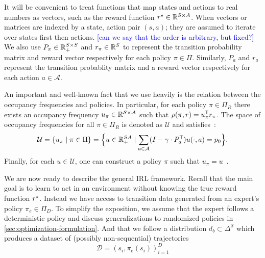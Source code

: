 \documentclass[10pt]{article}
\renewcommand{\cite}{\citep}
\newcommand{\mm}[1]{\textcolor{blue}{[#1]}}
\begin{document}
It will be convenient to treat functions that map states and actions to real numbers as vectors, such as the reward function $r^{\mathnormal{\star}} \in \mathbb{R}^{S \times  A}$. When vectors or matrices are indexed by a state, action pair $(s,a)$; they are assumed to iterate over states first then actions. \mm{can we say that the order is arbitrary, but fixed?} We also use $P_{\pi} \in \mathbb{R}_+^{S \times S}$ and $r_{\pi}\in \mathbb{R}^S$  to represent the transition probability matrix and reward vector respectively for each policy $\pi\in \Pi$. Similarly, $P_a$ and $r_a$ represent the transition probablity matrix and a reward vector respectively for each action $a\in \mathcal{A}$.

An important and well-known fact that we use heavily is the relation between the occupancy frequencies and policies. In particular, for each policy $\pi\in\Pi_R$ there exists an occupancy frequency $u_{\pi}\in \mathbb{R}^{\mathcal{S}\times \mathcal{A}}$ such that $\rho(\pi, r) = u_{\pi}^{\mathsf{T}} r_{\pi}$. The space of occupancy frequencies for all $\pi\in \Pi_R$
is denoted as $\mathcal{U}$ and satisfies~\cite[Section~6.9]{Puterman1994}:
\[
  \mathcal{U}
  =
\left\{ u_{\pi} \mid  \pi \in \Pi \right\}
  = \Bigl\{ u\in \mathbb{R}^{SA}_{+} \mid \sum_{a\in \mathcal{A}} (I - \gamma\cdot P^{\mathsf{T}}_a) u(\cdot, a) = p_0 \Bigr\}.
\]
Finally, for each $u\in \mathcal{U}$, one can construct a policy $\pi$ such that $u_{\pi} = u$~\cite[Theorem~6.9.1]{Puterman1994}.



We are now ready to describe the general IRL framework. Recall that the main goal is to learn to act in an environment without knowing the true reward function $r^{\mathnormal{\star}}$. Instead we have access to transition data generated from an expert's policy $\pi_e \in \Pi_D$. To simplify the exposition, we assume that the expert follows a deterministic policy and discuss generalizations to randomized policies in \cref{sec:optimization-formulation}.
And that we follow a distribution $d_b \subset \Delta^{\mathcal{S}}$ which produces a dataset of (possibly non-sequential) trajectories
\[
  \mathcal{D} = {(s_i, \pi_e(s_i))}_{i=1}^D
\]

\end{document}
